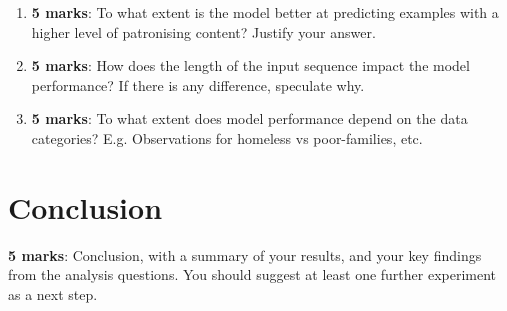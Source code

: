 \documentclass[11pt,a4paper]{article}
\begin{document}
\begin{enumerate}
    \item \textbf{5 marks}: To what extent is the model better at predicting examples with a higher level of patronising content? Justify your answer.
    \item \textbf{5 marks}: How does the length of the input sequence impact the model performance? If there is any difference, speculate why.
    \item \textbf{5 marks}: To what extent does model performance depend on the data categories? E.g. Observations for homeless vs poor-families, etc.
\end{enumerate}

\section{Conclusion}

\textbf{5 marks}: Conclusion, with a summary of your results, and your key
findings from the analysis questions. You should suggest at least one further
experiment as a next step.



\end{document}
